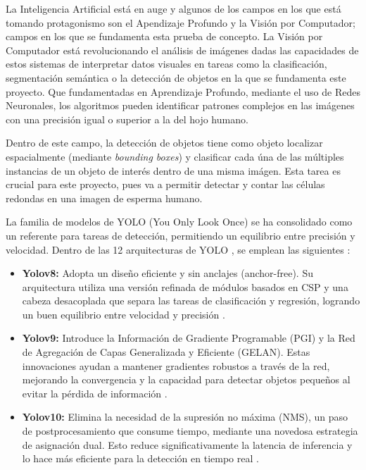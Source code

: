\documentclass[12pt,a4paper,onecolumn,oneside]{report}
\begin{document}
La Inteligencia Artificial está en auge y algunos de los campos en los que está tomando protagonismo son el Apendizaje Profundo y la Visión por Computador; campos en los que se fundamenta esta prueba de concepto.
La Visión por Computador está revolucionando el análisis de imágenes dadas las capacidades de estos sistemas de interpretar datos visuales en tareas como la clasificación, segmentación semántica o la detección de objetos en la que se fundamenta este proyecto.
Que fundamentadas en Aprendizaje Profundo, mediante el uso de Redes Neuronales, los algoritmos pueden identificar patrones complejos en las imágenes con una precisión igual o superior a la del hojo humano. 

Dentro de este campo, la detección de objetos tiene como objeto localizar espacialmente (mediante \textit{bounding boxes}) y clasificar cada úna de las múltiples instancias de un objeto de interés dentro de una misma imágen.
Esta tarea es crucial para este proyecto, pues va a permitir detectar y contar las células redondas en una imagen de esperma humano.

La familia de modelos de YOLO (You Only Look Once) \cite{ultralytics_models} se ha consolidado como un referente para tareas de detección, permitiendo un equilibrio entre precisión y velocidad.
Dentro de las 12 arquitecturas de YOLO \cite{ultralytics_models}, se emplean las siguientes \cite{defyolos}:

\begin{itemize}
  \item \textbf{Yolov8:} Adopta un diseño eficiente y sin anclajes (anchor-free). Su arquitectura utiliza una versión refinada de módulos basados en CSP y una cabeza desacoplada que separa las tareas de clasificación y regresión, logrando un buen equilibrio entre velocidad y precisión \cite{defyolos}.
  \item \textbf{Yolov9:} Introduce la Información de Gradiente Programable (PGI) y la Red de Agregación de Capas Generalizada y Eficiente (GELAN). Estas innovaciones ayudan a mantener gradientes robustos a través de la red, mejorando la convergencia y la capacidad para detectar objetos pequeños al evitar la pérdida de información \cite{defyolos}.
  \item \textbf{Yolov10:} Elimina la necesidad de la supresión no máxima (NMS), un paso de postprocesamiento que consume tiempo, mediante una novedosa estrategia de asignación dual. Esto reduce significativamente la latencia de inferencia y lo hace más eficiente para la detección en tiempo real \cite{defyolos}.
\end{itemize}
\end{document}

